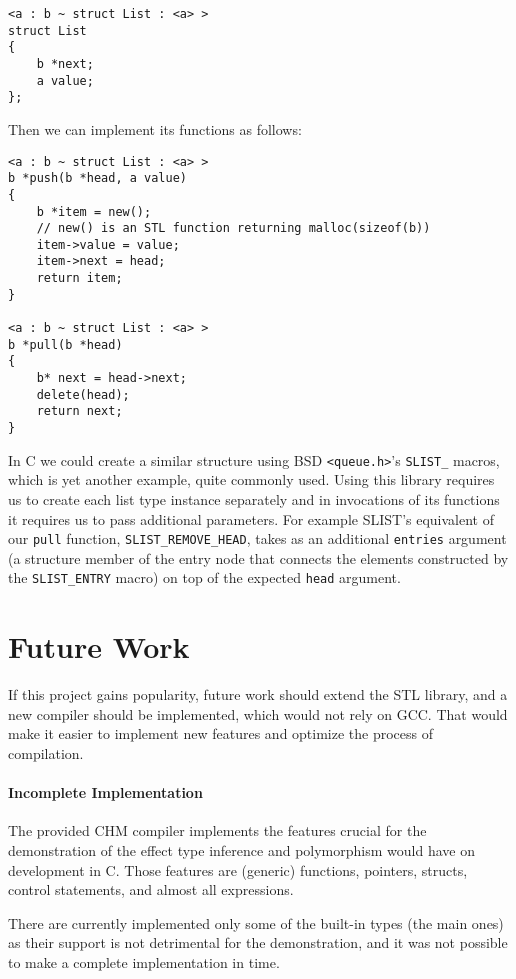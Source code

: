 \begin{lstlisting}
<a : b ~ struct List : <a> >
struct List
{
    b *next;
    a value;
};
\end{lstlisting}

Then we can implement its functions as follows:

\begin{lstlisting}
<a : b ~ struct List : <a> >
b *push(b *head, a value)
{
    b *item = new();
    // new() is an STL function returning malloc(sizeof(b))
    item->value = value;
    item->next = head;
    return item;
}

<a : b ~ struct List : <a> >
b *pull(b *head)
{
    b* next = head->next;
    delete(head);
    return next;
}
\end{lstlisting}

In C we could create a similar structure using BSD \lstinline{<queue.h>}'s \cite{pages2007queue} \lstinline{SLIST_} macros, which is yet another example, quite commonly used. Using this library requires us to create each list type instance separately and in invocations of its functions it requires us to pass additional parameters. For example SLIST's equivalent of our \lstinline{pull} function, \lstinline{SLIST_REMOVE_HEAD}, takes as an additional \lstinline{entries} argument (a structure member of the entry node that connects the elements constructed by the \lstinline{SLIST_ENTRY} macro) on top of the expected \lstinline{head} argument.

\section{Future Work}

If this project gains popularity, future work should extend the STL library, and a new compiler should be implemented, which would not rely on GCC. That would make it easier to implement new features and optimize the process of compilation.

\paragraph{Incomplete Implementation}

The provided CHM compiler implements the features crucial for the demonstration of the effect type inference and polymorphism would have on development in C. Those features are (generic) functions, pointers, structs, control statements, and almost all expressions.

There are currently implemented only some of the built-in types (the main ones) as their support is not detrimental for the demonstration, and it was not possible to make a complete implementation in time.

